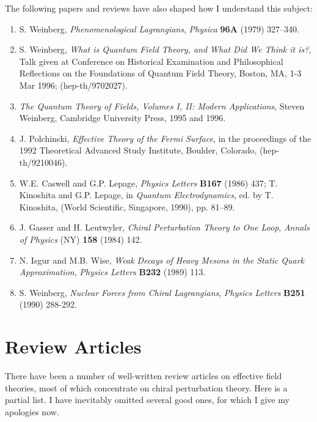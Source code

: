 \documentclass[12pt]{report}
\begin{document}
The following papers and reviews have also shaped how I
understand this subject:

\begin{enumerate}

\item
S. Weinberg, {\sl Phenomenological Lagrangians}, {\it
Physica} {\bf 96A} (1979) 327--340.

\item S. Weinberg, {\sl What is Quantum Field Theory, and
What Did We Think it is?}, Talk given at Conference on
Historical Examination and Philosophical Reflections on the
Foundations of Quantum Field Theory, Boston, MA, 1-3 Mar
1996; (hep-th/9702027).

\item
{\it The Quantum Theory of Fields, Volumes I,  II: Modern
Applications}, Steven Weinberg, Cambridge University Press,
1995 and 1996.

\item
J. Polchinski, {\sl  Effective Theory of the Fermi
Surface}, in the proceedings of the 1992 Theoretical
Advanced Study Institute, Boulder, Colorado,
(hep-th/9210046).

\item
W.E. Caswell and G.P. Lepage, {\it Physics Letters} {\bf
B167} (1986)  437; T. Kinoshita and G.P. Lepage, in {\it
Quantum Electrodynamics}, ed. by T. Kinoshita, (World
Scientific, Singapore, 1990), pp.  81--89.

\item
J. Gasser and H. Leutwyler, {\sl Chiral Perturbation Theory
to One Loop}, {\it Annals of Physics} (NY) {\bf 158} (1984)
142. 

\item
N. Isgur and M.B. Wise, {\sl Weak Decays of Heavy Mesons in
the Static Quark Approximation}, {\it Physics Letters} {\bf
B232} (1989) 113.

\item
S. Weinberg, {\sl Nuclear Forces from Chiral Lagrangians},
{\it Physics Letters} {\bf B251} (1990) 288-292.

\end{enumerate}

\section{Review Articles}

There have been a number of well-written review articles on
effective field theories, most of which concentrate on
chiral perturbation theory. Here is a partial list. I have
inevitably omitted several good ones, for which I give my
apologies now.
\end{document}
